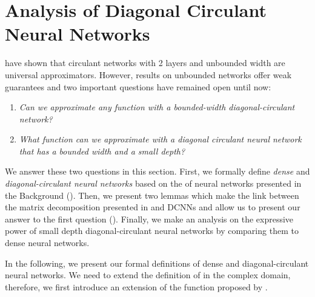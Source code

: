 
\vspace*{2cm}


 \section{Analysis of Diagonal Circulant Neural Networks}
\label{section:ch4-analysis_of_diagonal_circulant_neural_networks}

\citet{zhao2017theoretical} have shown that circulant networks with 2 layers and unbounded width are universal approximators.
However, results on unbounded networks offer weak guarantees and two important questions have remained open until now: 
\begin{enumerate}
  \item \emph{Can we approximate any function with a bounded-width diagonal-circulant network?}
  \item \emph{What function can we approximate with a diagonal circulant neural network that has a bounded width and a small depth?}
\end{enumerate}
We answer these two questions in this section.
First, we formally define \emph{dense} and \emph{diagonal-circulant neural networks} based on the  of neural networks presented in the Background ().
Then, we present two lemmas which make the link between the matrix decomposition presented in  and DCNNs and allow us to present our answer to the first question ().
Finally, we make an analysis on the expressive power of small depth diagonal-circulant neural networks by comparing them to dense neural networks. 


In the following, we present our formal definitions of dense and diagonal-circulant neural networks.
We need to extend the definition of  in the complex domain, therefore, we first introduce an extension of the \relu function proposed by \citet{trabelsi2018deep}.



